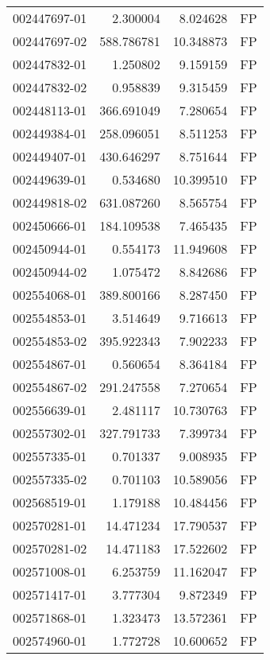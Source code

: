 \begin{tabular}{lrrl}
002447697-01 &    2.300004 &       8.024628 &   FP \\
002447697-02 &  588.786781 &      10.348873 &   FP \\
002447832-01 &    1.250802 &       9.159159 &   FP \\
002447832-02 &    0.958839 &       9.315459 &   FP \\
002448113-01 &  366.691049 &       7.280654 &   FP \\
002449384-01 &  258.096051 &       8.511253 &   FP \\
002449407-01 &  430.646297 &       8.751644 &   FP \\
002449639-01 &    0.534680 &      10.399510 &   FP \\
002449818-02 &  631.087260 &       8.565754 &   FP \\
002450666-01 &  184.109538 &       7.465435 &   FP \\
002450944-01 &    0.554173 &      11.949608 &   FP \\
002450944-02 &    1.075472 &       8.842686 &   FP \\
002554068-01 &  389.800166 &       8.287450 &   FP \\
002554853-01 &    3.514649 &       9.716613 &   FP \\
002554853-02 &  395.922343 &       7.902233 &   FP \\
002554867-01 &    0.560654 &       8.364184 &   FP \\
002554867-02 &  291.247558 &       7.270654 &   FP \\
002556639-01 &    2.481117 &      10.730763 &   FP \\
002557302-01 &  327.791733 &       7.399734 &   FP \\
002557335-01 &    0.701337 &       9.008935 &   FP \\
002557335-02 &    0.701103 &      10.589056 &   FP \\
002568519-01 &    1.179188 &      10.484456 &   FP \\
002570281-01 &   14.471234 &      17.790537 &   FP \\
002570281-02 &   14.471183 &      17.522602 &   FP \\
002571008-01 &    6.253759 &      11.162047 &   FP \\
002571417-01 &    3.777304 &       9.872349 &   FP \\
002571868-01 &    1.323473 &      13.572361 &   FP \\
002574960-01 &    1.772728 &      10.600652 &   FP \\

\end{tabular}
